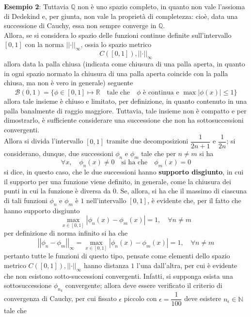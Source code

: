 \documentclass[a4paper]{extarticle}
\begin{document}
\vspace{1em}
\noindent
\textbf{Esempio 2}: Tuttavia $\mathbb{Q}$ non è uno spazio completo, in quanto non vale l'assioma di Dedekind e, per giunta, non vale la proprietà di completezza: cioè, data una successione di Cauchy, essa non sempre converge in $\mathbb{Q}$.\\
Allora, se si considera lo spazio delle funzioni continue definite sull'intervallo $[0,1]$ con la norma $\vert \vert \cdot \vert \vert_{\infty}$, ossia lo spazio metrico
\[C([0,1]), \vert \vert \cdot \vert \vert_{\infty}\]
allora data la palla chiusa (indicata come chiusura di una palla aperta, in quanto in ogni spazio normato la chiusura di una palla aperta coincide con la palla chiusa, ma non è vero in generale) seguente
\[\overline{\mathcal{B}(0,1)} = \{\phi \in [0,1] \longmapsto \mathbb{R} \hspace{1em} \text{tale che} \hspace{1em} \phi \text{ è continua e } \max \left \vert \phi(x) \right \vert \leq 1\}\]
allora tale insieme è chiuso e limitato, per definizione, in quanto contenuto in una palla banalmente di raggio maggiore. Tuttavia, tale insieme non è compatto e per dimostrarlo, è sufficiente considerare una successione che non ha sottosuccessioni convergenti.\\
Allora si divida l'intervallo $[0,1]$ tramite due decomposizioni $\dfrac{1}{2n+1}$ e $\dfrac{1}{2n}$; si considerano, dunque, due successioni $\phi_n$ e $\phi_m$ tale che per $n \neq m$ si ha
\[\forall x, \hspace{1em} \phi_n(x) \neq 0 \hspace{1em} \text{si ha che} \hspace{1em} \phi_m(x) = 0\]
si dice, in questo caso, che le due successioni hanno \textbf{supporto disgiunto}, in cui il supporto per una funzione viene definito, in generale, come la chiusura dei punti in cui la funzione è diversa da $0$.
Se, allora, si ha che il massimo di ciascuna di tali funzioni $\phi_n$ e $\phi_m$ è $1$ nell'intervallo $[0,1]$, è evidente che, per il fatto che hanno supporto disgiunto
\[\underset{x \in [0,1]}{\max} \left \vert \phi_n(x) - \phi_m(x)\right \vert = 1, \hspace{1em} \forall n \neq m\]
per definizione di norma infinito si ha che
\[\left \vert \left \vert \phi_n - \phi_m \right \vert \right \vert_\infty = \underset{x \in [0,1]}{\max} \left \vert \phi_n(x) - \phi_m(x)\right \vert = 1, \hspace{1em} \forall n \neq m\]
pertanto tutte le funzioni di questo tipo, pensate come elementi dello spazio metrico $C([0,1]), \vert \vert \cdot \vert \vert_{\infty}$ hanno distanza $1$ l'una dall'altra, per cui è evidente che non esistono sotto-successioni convergenti. Infatti, si supponga esista una sottosuccessione $\phi_{n_k}$ convergente; allora deve essere verificato il criterio di convergenza di Cauchy, per cui fissato $\epsilon$ piccolo con $\epsilon=\dfrac{1}{100}$ deve esistere $n_\epsilon \in \mathbb{N}$ tale che
\end{document}
